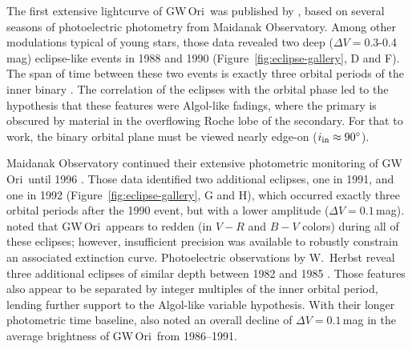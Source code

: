 \documentclass[twocolumn]{aastex61}
\newcommand{\obj}{GW\,Ori}
\begin{document}
The first extensive lightcurve of \obj\ was published by \citet{shevchenko92}, based on several seasons of photoelectric photometry from Maidanak Observatory.  Among other modulations typical of young stars, those data revealed two deep ($\Delta V = 0.3$-0.4\,mag) eclipse-like events in 1988 and 1990 (Figure~\ref{fig:eclipse-gallery}, D and F). The span of time between these two events is exactly three orbital periods of the inner binary \citep[the only known orbit at the time;][]{mathieu91}. 
The correlation of the eclipses with the orbital phase led to the hypothesis that these features were Algol-like fadings, where the primary is obscured by material in the overflowing Roche lobe of the secondary. For that to work, the binary orbital plane must be viewed nearly edge-on ($i_\mathrm{in} \approx 90\mbox{$^\circ$}$).  

Maidanak Observatory continued their extensive photometric monitoring of \obj\ until 1996 \citet{shevchenko98}. Those data identified two additional eclipses, one in 1991, and one in 1992 (Figure~\ref{fig:eclipse-gallery}, G and H), which occurred exactly three orbital periods after the 1990 event, but with a lower amplitude ($\Delta V = 0.1\,$mag). \citet{shevchenko98} noted that \obj\ appears to redden (in $V-R$ and $B-V$ colors) during all of these eclipses; however, insufficient precision was available to robustly constrain an associated extinction curve. Photoelectric observations by W.~Herbst reveal three additional eclipses of similar depth between 1982 and 1985 \citep[events A - C;][]{shevchenko98}. Those features also appear to be separated by integer multiples of the inner orbital period, lending further support to the Algol-like variable hypothesis. With their longer photometric time baseline, \citet{shevchenko98} also noted an overall decline of $\Delta V = 0.1$\,mag in the average brightness of \obj\ from 1986--1991.
\end{document}
